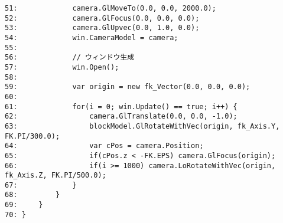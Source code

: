 \begin{breakbox}
\begin{verbatim}
51:             camera.GlMoveTo(0.0, 0.0, 2000.0);
52:             camera.GlFocus(0.0, 0.0, 0.0);
53:             camera.GlUpvec(0.0, 1.0, 0.0);
54:             win.CameraModel = camera;
55: 
56:             // ウィンドウ生成
57:             win.Open();
58: 
59:             var origin = new fk_Vector(0.0, 0.0, 0.0);
60: 
61:             for(i = 0; win.Update() == true; i++) {
62:                 camera.GlTranslate(0.0, 0.0, -1.0);
63:                 blockModel.GlRotateWithVec(origin, fk_Axis.Y, FK.PI/300.0);
64:                 var cPos = camera.Position;
65:                 if(cPos.z < -FK.EPS) camera.GlFocus(origin);
66:                 if(i >= 1000) camera.LoRotateWithVec(origin, fk_Axis.Z, FK.PI/500.0);
67:             }
68:         }
69:     }
70: }
\end{verbatim}
\end{breakbox}

